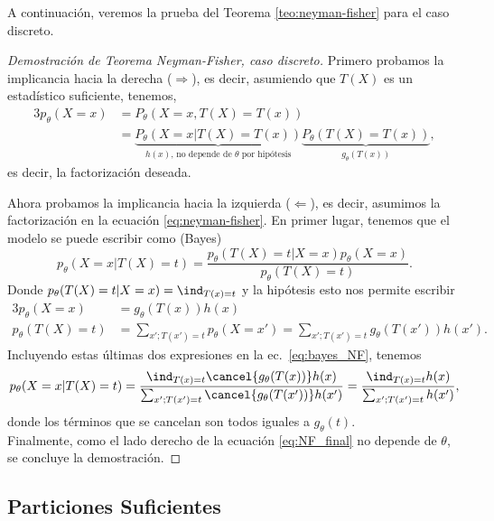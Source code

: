 A continuación, veremos la prueba del Teorema \ref{teo:neyman-fisher} para el caso discreto. 


\begin{proof}[Demostración de Teorema Neyman-Fisher, caso discreto]
Primero probamos la implicancia hacia la derecha ($\Rightarrow$), es decir, asumiendo que $T(X)$ es un estadístico suficiente, tenemos,
	\begin{alignat*}{3}
		p_\theta(X=x) 	&= P_\theta(X=x, T(X)=T(x))\\
						&= \underbrace{P_\theta(X=x| T(X)=T(x))}_{h(x)\text{, no depende de $\theta$ por hipótesis}} \underbrace{P_\theta(T(X)=T(x))}_{g_\theta(T(x))},
	\end{alignat*}
	es decir, la factorización deseada.

	Ahora probamos la implicancia hacia la izquierda ($\Leftarrow$), es decir, asumimos la factorización en la ecuación \eqref{eq:neyman-fisher}. En primer lugar, tenemos que el modelo se puede escribir como (Bayes)
	\begin{equation}
		\label{eq:bayes_NF}
		p_\theta(X=x|T(X)=t)=  \frac{p_\theta(T(X)=t|X=x)p_\theta(X=x)}{p_\theta(T(X)=t)}.
	\end{equation}
	Donde $p_\theta(T(X)=t|X=x)= \ind_{T(x)=t}$ y la hipótesis esto nos permite escribir 
	\begin{alignat*}{3}
		p_\theta(X=x)&=  g_\theta(T(x))h(x)\\
		p_\theta(T(X)=t) &= \sum_{x';T(x')=t}p_\theta(X=x') = \sum_{x';T(x')=t}g_\theta(T(x'))h(x').
	\end{alignat*}
	Incluyendo estas últimas dos expresiones en la ec.~\eqref{eq:bayes_NF}, tenemos 
	\begin{equation}
		\label{eq:NF_final}
		p_\theta(X=x|T(X)=t)=  \frac{\ind_{T(x)=t}\cancel{g_\theta(T(x))}h(x)}{\sum_{x';T(x')=t}\cancel{g_\theta(T(x'))}h(x')}=  \frac{\ind_{T(x)=t}h(x)}{\sum_{x';T(x')=t}h(x')},
	\end{equation}
	donde los términos que se cancelan son todos iguales a $g_\theta(t)$.\\

	Finalmente, como el lado derecho de la ecuación \eqref{eq:NF_final} no depende de $\theta$, se concluye la demostración.
\end{proof}

\subsection{Particiones Suficientes}

